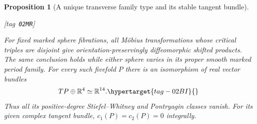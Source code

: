 \documentclass[11pt,a4paper]{article}
\numberwithin{equation}{section}
\newtheorem{proposition}[proposition]{Proposition}
\theoremstyle{definition}
\newcommand{\StatementRecord}[4]{{\upshape\footnotesize[tag~\texttt{#3}]}\enspace\ignorespaces}
\begin{document}
\begin{proposition}[A unique transverse family type and its stable tangent bundle]\hypertarget{tag-02MR}{}\label{maps:src:E.2.7}
\StatementRecord{maps:src:E.2.7}{proved}{02MR}{\cref{maps:src:E.2.6}}


For fixed marked sphere fibrations, all M\"obius transformations
whose critical triples are disjoint give orientation-preservingly
diffeomorphic shifted products. The same conclusion holds while
either sphere varies in its proper smooth marked period family.
For every such fivefold $P$ there is an isomorphism of real vector
bundles
\begin{equation}
 TP\oplus\mathbb R^4\simeq\mathbb R^{14}.
 \hypertarget{tag-02BI}{}\label{maps:eq:E.MV9}
\end{equation}
Thus all its positive-degree Stiefel--Whitney and Pontryagin
classes vanish. For its given complex tangent bundle,
$c_1(P)=c_2(P)=0$ integrally.
\end{proposition}
\end{document}
